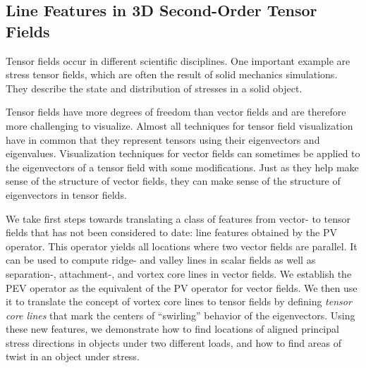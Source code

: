 \subsection{Line Features in \ac{3D} Second-Order Tensor Fields} %
\label{sub:contr_tensor_fields}
%
Tensor fields occur in different scientific disciplines.
%
One important example are stress tensor fields, which are often the result of
solid mechanics simulations.
%
They describe the state and distribution of stresses in a solid object.
%

%
Tensor fields have more degrees of freedom than vector fields and are therefore
more challenging to visualize.
%
Almost all techniques for tensor field visualization have in common that they
represent tensors using their eigenvectors and eigenvalues.
%
Visualization techniques for vector fields can sometimes be applied to the
eigenvectors of a tensor field with some modifications.
%
Just as they help make sense of the structure of vector fields, they can make
sense of the structure of eigenvectors in tensor fields.
%

%
We take first steps towards translating a class of features from vector- to
tensor fields that has not been considered to date:
%
line features obtained by the \ac{PV} operator.
%
This operator yields all locations where two vector fields are parallel.
%
It can be used to compute ridge- and valley lines in scalar fields as well as
separation-, attachment-, and vortex core lines in vector fields.
%
We establish the \ac{PEV} operator as the equivalent of the \ac{PV} operator
for vector fields.
%
We then use it to translate the concept of vortex core lines to tensor fields by
defining \emph{tensor core lines} that mark the centers of ``swirling'' behavior
of the eigenvectors.
%
Using these new features, we demonstrate how to find locations of aligned
principal stress directions in objects under two different loads, and how to
find areas of twist in an object under stress.
%
%
%
